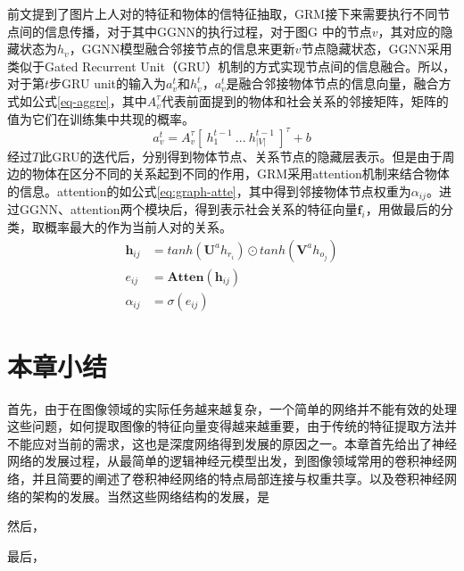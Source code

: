 前文提到了图片上人对的特征和物体的信特征抽取，GRM接下来需要执行不同节点间的信息传播，对于其中GGNN的执行过程，对于图$\mathrm{G}$ 中的节点$v$，其对应的隐藏状态为$h_{v}$，GGNN模型融合邻接节点的信息来更新$v$节点隐藏状态，GGNN采用类似于Gated Recurrent Unit（GRU）\cite{cho2014learning}机制的方式实现节点间的信息融合。所以，对于第$t$步GRU unit的输入为$a_v^t$和$h_v^t$，$a_v^t$是融合邻接物体节点的信息向量，融合方式如公式\ref{eq-aggre}，其中$A_v^{\tau}$代表前面提到的物体和社会关系的邻接矩阵，矩阵的值为它们在训练集中共现的概率。
\begin{equation}\label{eq-aggre}
    a_v^t = A_{v}^{\tau}[~h_1^{t-1}~...~h_{|V|}^{t-1}~]^{\tau} + b
\end{equation}
经过$T$此GRU的迭代后，分别得到物体节点、关系节点的隐藏层表示。但是由于周边的物体在区分不同的关系起到不同的作用，GRM采用attention机制来结合物体的信息。attention的如公式\ref{eq:graph-atte}，其中得到邻接物体节点权重为$\alpha_{ij}$。进过GGNN、attention两个模块后，得到表示社会关系的特征向量$\mathbf{f}_{i}$，用做最后的分类，取概率最大的作为当前人对的关系。
\begin{equation}\label{eq:graph-atte}
    \begin{split}
        \mathbf{h}_{ij} &= tanh(\mathbf{U}^ah_{r_{i}}) \odot tanh(\mathbf{V}^ah_{o_{j}}) \\
        e_{ij} &= \mathbf{Atten}(\mathbf{h}_{ij}) \\
        \alpha_{ij} &= \sigma(e_{ij})
    \end{split}
\end{equation}

\section{本章小结}

首先，由于在图像领域的实际任务越来越复杂，一个简单的网络并不能有效的处理这些问题，如何提取图像的特征向量变得越来越重要，由于传统的特征提取方法并不能应对当前的需求，这也是深度网络得到发展的原因之一。本章首先给出了神经网络的发展过程，从最简单的逻辑神经元模型出发，到图像领域常用的卷积神经网络，并且简要的阐述了卷积神经网络的特点局部连接与权重共享。以及卷积神经网络的架构的发展。当然这些网络结构的发展，是

然后，

最后，







